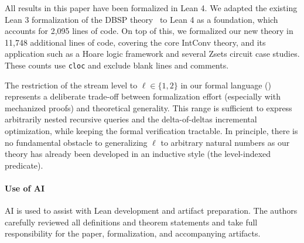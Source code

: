 All results in this paper have been formalized in Lean 4. We adapted the existing Lean 3 formalization of the DBSP theory~\cite{Chajed2022dbspF} to Lean 4 as a foundation, which accounts for 2,095 lines of code. On top of this, we formalized our new theory in 11,748 additional lines of code, covering the core IntConv theory, and its application such as a Hoare logic framework and several Zsets circuit case studies. These counts use \texttt{cloc} and exclude blank lines and comments.

The restriction of the stream level to $\ell \in \{1, 2\}$ in our formal language () represents a deliberate trade-off between formalization effort (especially with mechanized proofs) and theoretical generality. This range is sufficient to express arbitrarily nested recursive queries and the delta-of-deltas incremental optimization, while keeping the formal verification tractable. In principle, there is no fundamental obstacle to generalizing $\ell$ to arbitrary natural numbers as our theory has already been developed in an inductive style (the level-indexed predicate).

\paragraph{Use of AI} AI is used to assist with Lean development and artifact preparation. The authors carefully reviewed all definitions and theorem statements and take full responsibility for the paper, formalization, and accompanying artifacts.
